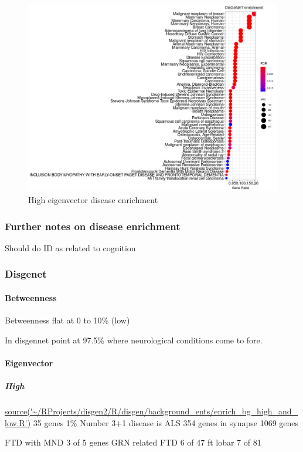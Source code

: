 \begin{figure}
    \centering
    \includegraphics[width=\textwidth]{images/Rplot_high_eigenvector_centrality_disggen0point9.png}
    \caption{High eigenvector disease enrichment}
    \label{fig:high eigenvector disease enrichment cut off 0.05}
\end{figure}


\subsubsection{Further notes on disease enrichment}
Should do ID as related to cognition

\subsubsection{Disgenet}
\paragraph{Betweenness}
Betweenness flat at 0 to 10\% (low)

In disgennet point at 97.5\% where neurological conditions come to fore.
\paragraph{Eigenvector}
\subparagraph{High}
\url{source('~/RProjects/disgen2/R/disgen/background_ents/enrich_bg_high_and_low.R')}
35 genes 1\%
Number 3+1 disease is ALS 354 genes in synapse
1069 genes

FTD with MND 3 of 5 genes
GRN related FTD 6 of 47
ft lobar 7 of 81

